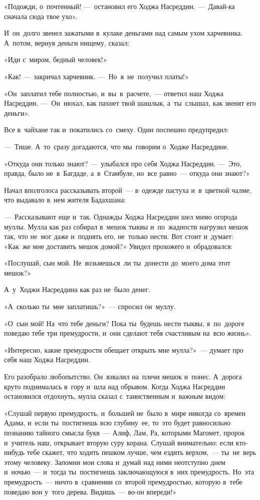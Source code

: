 \documentclass[12pt,a4paper]{book}
\begin{document}
«Подожди, о~почтенный! —~остановил его Ходжа Насреддин. —~Давай-ка сначала сюда твое ухо».

И~он~долго звенел зажатыми в~кулаке деньгами над самым ухом харчевника. А~потом, вернув деньги нищему, сказал:

«Иди с~миром, бедный человек!»

«Как! —~закричал харчевник. —~Но~я~не~получил платы!»

«Он~заплатил тебе полностью, и~вы~в~расчете,~— ответил наш Ходжа Насреддин. —~Он~нюхал, как пахнет твой шашлык, а~ты~слышал, как звенят его деньги».

Все в~чайхане так и~покатились со~смеху. Один поспешно предупредил:

—~Тише. А~то~сразу догадаются, что мы~говорим о~Ходже Насреддине.

«Откуда они только знают? —~улыбался про себя Ходжа Насреддин. —~Это, правда, было не~в~Багдаде, а~в~Стамбуле, но~все равно~— откуда они знают?»

Начал вполголоса рассказывать второй~— в~одежде пастуха и~в~цветной чалме, что выдавало в~нем жителя Бадахшана:

—~Рассказывают еще и~так. Однажды Ходжа Насреддин шел мимо огорода муллы. Мулла как раз собирал в~мешок тыквы и~по~жадности нагрузил мешок так, что не~мог даже и~поднять его, не~только нести. Вот стоит и~думает: «Как~же мне доставить мешок домой?» Увидел прохожего и~обрадовался:

«Послушай, сын мой. Не~возьмешься~ли ты~донести до~моего дома этот мешок?»

А~у~Ходжи Насреддина как раз не~было денег.

«А~сколько ты~мне заплатишь?»~— спросил он~муллу.

«О~сын мой! На~что тебе деньги? Пока ты~будешь нести тыквы, я~по~дороге поведаю тебе три премудрости, и~они сделают тебя счастливым на~всю жизнь».

«Интересно, какие премудрости обещает открыть мне мулла?»~— думает про себя наш Ходжа Насреддин.

Его разобрало любопытство. Он~взвалил на~плечи мешок и~понес. А~дорога круто поднималась в~гору и~шла над обрывом. Когда Ходжа Насреддин остановился отдохнуть, мулла сказал с~таинственным и~важным видом:

«Слушай первую премудрость, и~большей не~было в~мире никогда со~времен Адама, и~если ты~постигнешь всю глубину~ее, то~это будет равносильно познанию тайного смысла букв~— Алиф, Лам, Ра, которыми Магомет, пророк и~учитель наш, открывает вторую суру корана. Слушай внимательно: если кто-нибудь тебе скажет, что ходить пешком лучше, чем ездить верхом,~— ты~не~верь этому человеку. Запомни мои слова и~думай над ними неотступно днем и~ночью~— и~тогда ты~постигнешь заключающуюся в~них премудрость. Но~эта премудрость~— ничто в~сравнении со~второй премудростью, которую я~тебе поведаю вон у~того дерева. Видишь~— во-он впереди!»
\end{document}
